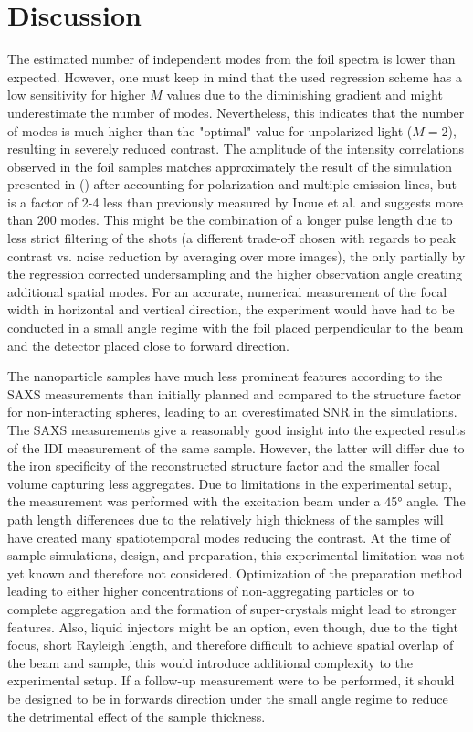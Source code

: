 \section{Discussion}

The estimated number of independent modes from the foil spectra is lower than expected. However, one must keep in mind that the used regression scheme has a low sensitivity for higher $M$ values due to the diminishing gradient and might underestimate the number of modes. Nevertheless, this indicates that the number of modes is much higher than the "optimal" value for unpolarized light ($M=2$), resulting in severely reduced contrast. The amplitude of the intensity correlations observed in the foil samples matches approximately the result of the simulation presented in   () after accounting for polarization and multiple emission lines, but is a factor of 2-4 less than previously measured by Inoue et al. and suggests more than 200 modes. This might be the combination of a longer pulse length due to less strict filtering of the shots (a different trade-off chosen with regards to peak contrast vs. noise reduction by averaging over more images), the only partially by the regression corrected undersampling and the higher observation angle creating additional spatial modes. For an accurate, numerical measurement of the focal width in horizontal and vertical direction, the experiment would have had to be conducted in a small angle regime with the foil placed perpendicular to the beam and the detector placed close to forward direction.

The nanoparticle samples have much less prominent features according to the SAXS measurements than initially planned and compared to the structure factor for non-interacting spheres, leading to an overestimated SNR in the simulations. The SAXS measurements give a reasonably good insight into the expected results of the IDI measurement of the same sample. However, the latter will differ due to the iron specificity of the reconstructed structure factor and the smaller focal volume capturing less aggregates. Due to limitations in the experimental setup, the measurement was performed with the excitation beam under a 45° angle. The path length differences due to the relatively high thickness of the samples will have created many spatiotemporal modes reducing the contrast. At the time of sample simulations, design, and preparation, this experimental limitation was not yet known and therefore not considered.
Optimization of the preparation method leading to either higher concentrations of non-aggregating particles or to complete aggregation and the formation of super-crystals might lead to stronger features. Also, liquid injectors might be an option, even though, due to the tight focus, short Rayleigh length, and therefore difficult to achieve spatial overlap of the beam and sample, this would introduce additional complexity to the experimental setup. If a follow-up measurement were to be performed, it should be designed to be in forwards direction under the small angle regime to reduce the detrimental effect of the sample thickness.

